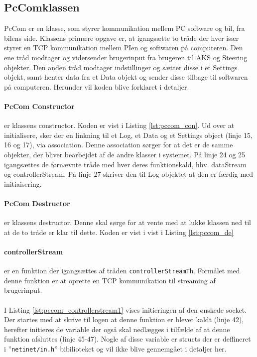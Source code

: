 \subsection{PcComklassen} \label{sec:pccom_impl}

PcCom er en klasse, som styrer kommunikation mellem PC software og bil, fra bilens side. Klassens primære opgave er, at igangsætte to tråde der hver især styrer en TCP kommunikation mellem PIen og softwaren på computeren. Den ene tråd modtager og vidersender brugerinput fra brugeren til AKS og Steering objekter. Den anden tråd modtager indstillinger og sætter disse i et Settings objekt, samt henter data fra et Data objekt og sender disse tilbage til softwaren på computeren.
Herunder vil koden blive forklaret i detaljer.


\paragraph{PcCom Constructor} er klassens constructor. Koden er vist i Listing \ref{lst:pccom_con}. Ud over at initialisere, sker der en linkning til et Log, et Data og et Settings object (linje 15, 16 og 17), via association. Denne association sørger for at det er de samme objekter, der bliver bearbejdet af de andre klasser i systemet. På linje 24 og 25 igangsættes de førnævnte tråde med hver deres funktionskald, hhv. dataStream og controllerStream. På linje 27 skriver den til Log objektet at den er færdig med initiaisering.



\paragraph{PcCom Destructor} er klassens destructor. Denne skal sørge for at vente med at lukke klassen ned til at de to tråde er klar til dette. Koden er vist i vist i Listing \ref{lst:pccom_de}



\clearpage

\paragraph{controllerStream} er en funktion der igangsættes af tråden \texttt{controllerStreamTh}. Formålet med denne funktion er at oprette en TCP kommunikation til streaming af brugerinput.\\\\
I Listing \ref{lst:pccom_controllerstream1} vises initieringen af den ønskede socket. Der startes med at skrive til logen at denne funktion er blevet kaldt (linje 42), herefter initieres de variable der også skal nedlægges i tilfælde af at denne funktion afsluttes (linje 45-47). Nogle af disse variable er structs der er deffineret i ''\texttt{netinet/in.h}'' bibilioteket og vil ikke blive gennemgået i detaljer her.


